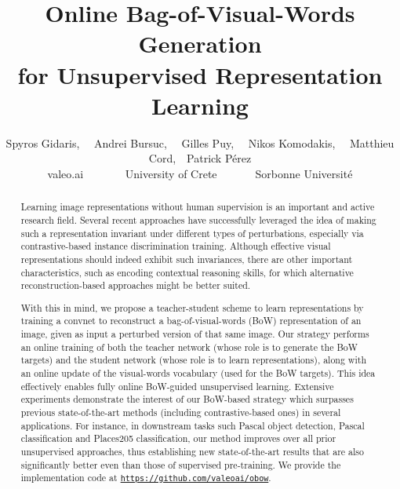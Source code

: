\documentclass[final]{cvpr}
\begin{document}
\title{Online Bag-of-Visual-Words Generation\\for Unsupervised Representation Learning}

\author{
Spyros Gidaris, \ \
Andrei Bursuc, \ \
Gilles Puy, \ \
Nikos Komodakis, \ \ 
Matthieu Cord,\ \
Patrick P\'erez\\
valeo.ai \ \ \ \ \ \ \  University of Crete\ \ \ \ \ \ \ Sorbonne Université\\
}


\maketitle

\begin{abstract}
Learning image representations without human supervision is an important and active research field. Several recent approaches have successfully leveraged the idea of making such a representation invariant under different types of perturbations, especially via contrastive-based instance discrimination training. Although effective visual representations should indeed exhibit such invariances, there are other important characteristics, such as encoding contextual reasoning skills, for which alternative reconstruction-based approaches might be better suited.

With this in mind, we propose a teacher-student scheme to learn representations by training a convnet to reconstruct a bag-of-visual-words (BoW) representation of an image, given as input a perturbed version of that same image. Our strategy performs an online training of both the teacher network (whose role is to generate the BoW targets) and the student network (whose role is to learn representations), 
along with an online update of the visual-words vocabulary (used for the BoW targets).
This idea effectively enables fully online BoW-guided unsupervised learning.
Extensive experiments demonstrate the interest of our BoW-based strategy which surpasses previous state-of-the-art methods (including contrastive-based ones) in several applications.
For instance, in downstream tasks such Pascal object detection, Pascal classification and Places205 classification, our method improves over all prior unsupervised approaches, thus establishing new state-of-the-art results that are also significantly better even than those of supervised pre-training.
We provide the implementation code at {{\tt \small \url{https://github.com/valeoai/obow}}}.
\end{abstract}
\end{document}
